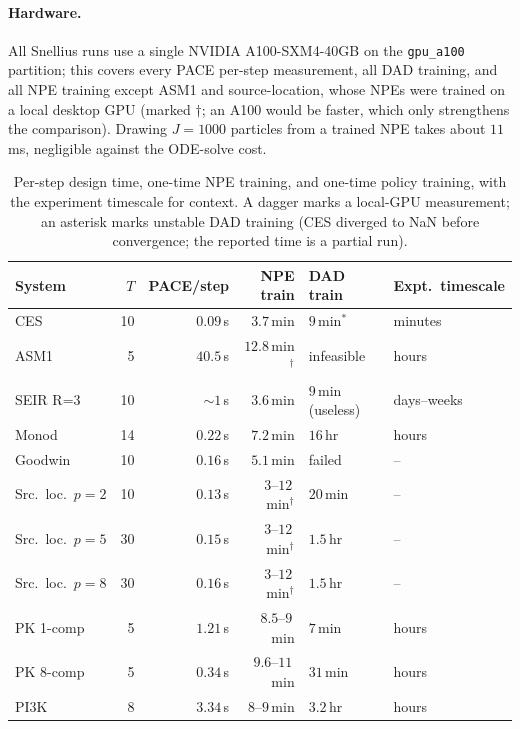 \paragraph{Hardware.} All Snellius runs use a single NVIDIA A100-SXM4-40GB on the
\texttt{gpu\_a100} partition; this covers every PACE per-step measurement, all DAD
training, and all NPE training except ASM1 and source-location, whose NPEs were trained
on a local desktop GPU (marked $\dagger$; an A100 would be faster, which only
strengthens the comparison). Drawing $J{=}1000$ particles from a trained NPE takes
about $11$\,ms, negligible against the ODE-solve cost.

\begin{table}[h]
\centering\small
\caption[Wall-clock cost]{Per-step design time, one-time NPE training, and one-time
policy training, with the experiment timescale for context. A dagger marks a local-GPU
measurement; an asterisk marks unstable DAD training (CES diverged to NaN before
convergence; the reported time is a partial run).}
\label{tab:walltime}
\begin{tabular}{lrrrll}
\toprule
System & $T$ & PACE/step & NPE train & DAD train & Expt.\ timescale \\
\midrule
CES & 10 & $0.09$\,s & $3.7$\,min & $9$\,min$^*$ & minutes \\
ASM1 & 5 & $40.5$\,s & $12.8$\,min$^\dagger$ & infeasible & hours \\
SEIR R=3 & 10 & ${\sim}1$\,s & $3.6$\,min & $9$\,min (useless) & days--weeks \\
Monod & 14 & $0.22$\,s & $7.2$\,min & $16$\,hr & hours \\
Goodwin & 10 & $0.16$\,s & $5.1$\,min & failed & -- \\
Src.\ loc.\ $p{=}2$ & 10 & $0.13$\,s & $3$--$12$\,min$^\dagger$ & $20$\,min & -- \\
Src.\ loc.\ $p{=}5$ & 30 & $0.15$\,s & $3$--$12$\,min$^\dagger$ & $1.5$\,hr & -- \\
Src.\ loc.\ $p{=}8$ & 30 & $0.16$\,s & $3$--$12$\,min$^\dagger$ & $1.5$\,hr & -- \\
PK 1-comp & 5 & $1.21$\,s & $8.5$--$9$\,min & $7$\,min & hours \\
PK 8-comp & 5 & $0.34$\,s & $9.6$--$11$\,min & $31$\,min & hours \\
PI3K & 8 & $3.34$\,s & $8$--$9$\,min & $3.2$\,hr & hours \\
\bottomrule
\end{tabular}
\end{table}

